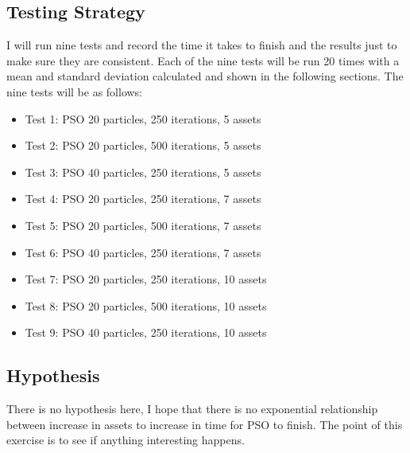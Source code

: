 \documentclass{pdfmx4020}
\begin{document}
    \subsection{Testing Strategy} %
    \label{sub:testing_strategy}
      I will run nine tests and record the time it takes to finish and the results just to make sure they are consistent. Each of the nine tests will be run 20 times with a mean and standard deviation calculated and shown in the following sections. The nine tests will be as follows:
        \begin{itemize}
          \item Test 1: PSO 20 particles, 250 iterations, 5 assets
          \item Test 2: PSO 20 particles, 500 iterations, 5 assets
          \item Test 3: PSO 40 particles, 250 iterations, 5 assets
          \item Test 4: PSO 20 particles, 250 iterations, 7 assets
          \item Test 5: PSO 20 particles, 500 iterations, 7 assets
          \item Test 6: PSO 40 particles, 250 iterations, 7 assets
          \item Test 7: PSO 20 particles, 250 iterations, 10 assets
          \item Test 8: PSO 20 particles, 500 iterations, 10 assets
          \item Test 9: PSO 40 particles, 250 iterations, 10 assets
        \end{itemize}

    \subsection{Hypothesis} %
    \label{sub:hypothesis}
    There is no hypothesis here, I hope that there is no exponential relationship between increase in assets to increase in time for PSO to finish. The point of this exercise is to see if anything interesting happens. 
\end{document}
